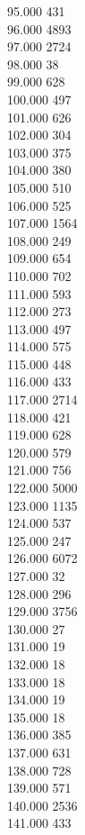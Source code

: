 { 95.000	431 \\
 96.000	4893 \\
 97.000	2724 \\
 98.000	38 \\
 99.000	628 \\
 100.000	497 \\
 101.000	626 \\
 102.000	304 \\
 103.000	375 \\
 104.000	380 \\
 105.000	510 \\
 106.000	525 \\
 107.000	1564 \\
 108.000	249 \\
 109.000	654 \\
 110.000	702 \\
 111.000	593 \\
 112.000	273 \\
 113.000	497 \\
 114.000	575 \\
 115.000	448 \\
 116.000	433 \\
 117.000	2714 \\
 118.000	421 \\
 119.000	628 \\
 120.000	579 \\
 121.000	756 \\
 122.000	5000 \\
 123.000	1135 \\
 124.000	537 \\
 125.000	247 \\
 126.000	6072 \\
 127.000	32 \\
 128.000	296 \\
 129.000	3756 \\
 130.000	27 \\
 131.000	19 \\
 132.000	18 \\
 133.000	18 \\
 134.000	19 \\
 135.000	18 \\
 136.000	385 \\
 137.000	631 \\
 138.000	728 \\
 139.000	571 \\
 140.000	2536 \\
 141.000	433 \\
}
